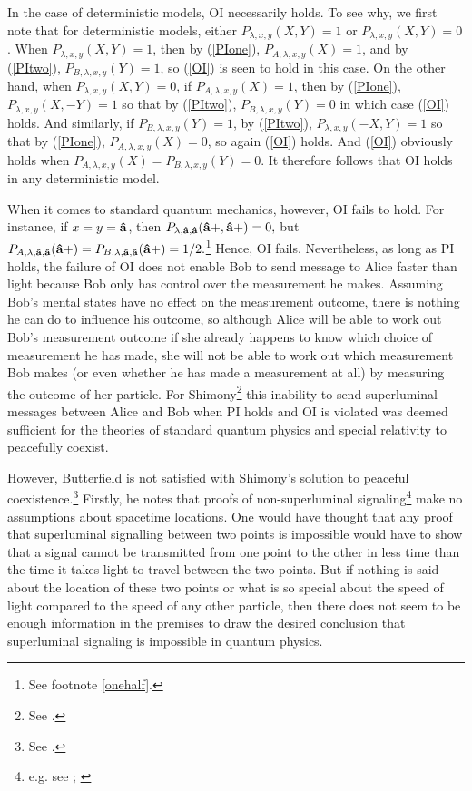 In the case of deterministic models, OI necessarily holds. To see why, we first note that for deterministic models, either $P_{\lambda,x,y}(X,Y)=1$ or $P_{\lambda,x,y}(X,Y)=0$. When $P_{\lambda,x,y}(X,Y)=1$, then by (\ref{PIone}), $P_{A, \lambda,x,y}(X)=1$, and by (\ref{PItwo}), $P_{B, \lambda,x,y}(Y)=1$, so (\ref{OI}) is seen to hold in this case. On the other hand, when $P_{\lambda,x,y}(X,Y)=0$,  if $P_{A, \lambda,x,y}(X)=1$, then by (\ref{PIone}), $P_{\lambda,x,y} (X,-Y)=1$ so that by (\ref{PItwo}), $P_{B, \lambda,x,y}(Y)=0$ in which case (\ref{OI}) holds. And similarly, if $P_{B, \lambda,x,y}(Y)=1$, by (\ref{PItwo}), $P_{\lambda,x,y} (-X,Y)=1$ so that by (\ref{PIone}), $P_{A, \lambda,x,y}(X)=0$, so again (\ref{OI}) holds. And (\ref{OI}) obviously holds when $P_{A, \lambda,x,y}(X)=P_{B, \lambda,x,y}(Y)=0$. It therefore follows that OI holds in any deterministic model.

When it comes to standard quantum mechanics, however, OI fails to hold. For instance, if $x=y=\vb{\hat{a}}$, then $P_{\lambda,\vb{\hat{a}},\vb{\hat{a}}}(\vb{\hat{a}+},\vb{\hat{a}+})=0,$ but $P_{A, \lambda,\vb{\hat{a}},\vb{\hat{a}}}(\vb{\hat{a}+})=P_{B, \lambda,\vb{\hat{a}},\vb{\hat{a}}}(\vb{\hat{a}+})=1/2.$\footnote{See footnote \ref{onehalf}. } Hence, OI fails. Nevertheless, as long as PI holds, the failure of OI does not enable Bob to send message to Alice faster than light because Bob only has control over the measurement he makes. Assuming Bob's mental states have no effect on the measurement outcome, there is nothing he can do to influence his outcome, so although Alice will be able to work out Bob's measurement outcome if she already happens to know which choice of measurement he has made, she will not be able to work out which measurement Bob makes (or even whether he has made a measurement at all) by measuring the outcome of her particle. For Shimony\footnote{See \cite[146-147]{Shimony86}.} this inability to send superluminal messages between Alice and Bob when PI holds and OI is violated was deemed sufficient for the theories of standard quantum physics and special relativity to peacefully coexist. 

However, Butterfield is not satisfied with Shimony's solution to peaceful coexistence.\footnote{See \cite[p. 12]{Butterfield}.} Firstly, he notes that proofs of non-superluminal signaling\footnote{e.g. see \cite[p. 113--116]{Redhead}; \cite[p. 139--140]{Hiley}} make no assumptions about spacetime locations. One would have thought that any proof that superluminal signalling between two points is impossible would have to show that a signal cannot be transmitted from one point to the other in less time than the time it takes light to travel between the two points. But if nothing is said about the location of these two points or what is so special about the speed of light compared to the speed of any other particle, then there does not seem to be enough information in the premises to draw the desired conclusion that superluminal signaling is impossible in quantum physics.

